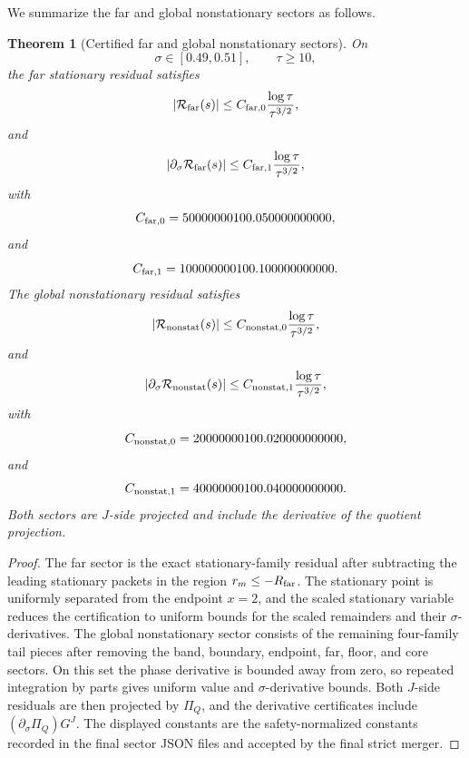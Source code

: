 \documentclass[11pt]{article}
\newtheorem{theorem}{Theorem}[section]
\newcommand{\s}{s}
\newcommand{\sig}{\sigma}
\newcommand{\tauh}{\tau}
\newcommand{\Rfar}{\mathcal R_{\rm far}}
\newcommand{\Rnonstat}{\mathcal R_{\rm nonstat}}
\newcommand{\PiQ}{\Pi_Q}
\begin{document}
We summarize the far and global nonstationary sectors as follows.

\begin{theorem}[Certified far and global nonstationary sectors]
On
\[
        \sig\in[0.49,0.51],
        \qquad
        \tauh\ge10,
\]
the far stationary residual satisfies
\[
        |\Rfar(\s)|
        \le
        C_{{\rm far},0}
        \frac{\log\tauh}{\tauh^{3/2}},
\]
and
\[
        |\partial_\sig\Rfar(\s)|
        \le
        C_{{\rm far},1}
        \frac{\log\tauh}{\tauh^{3/2}},
\]
with
\[
        C_{{\rm far},0}
        =
        50000000100.050000000000,
\]
and
\[
        C_{{\rm far},1}
        =
        100000000100.100000000000.
\]
The global nonstationary residual satisfies
\[
        |\Rnonstat(\s)|
        \le
        C_{{\rm nonstat},0}
        \frac{\log\tauh}{\tauh^{3/2}},
\]
and
\[
        |\partial_\sig\Rnonstat(\s)|
        \le
        C_{{\rm nonstat},1}
        \frac{\log\tauh}{\tauh^{3/2}},
\]
with
\[
        C_{{\rm nonstat},0}
        =
        20000000100.020000000000,
\]
and
\[
        C_{{\rm nonstat},1}
        =
        40000000100.040000000000.
\]
Both sectors are \(J\)-side projected and include the derivative of the
quotient projection.
\end{theorem}

\begin{proof}
The far sector is the exact stationary-family residual after subtracting the
leading stationary packets in the region \(r_m\le -R_{\rm far}\).  The
stationary point is uniformly separated from the endpoint \(x=2\), and the
scaled stationary variable reduces the certification to uniform bounds for the
scaled remainders and their \(\sig\)-derivatives.  The global nonstationary
sector consists of the remaining four-family tail pieces after removing the
band, boundary, endpoint, far, floor, and core sectors.  On this set the phase
derivative is bounded away from zero, so repeated integration by parts gives
uniform value and \(\sig\)-derivative bounds.  Both \(J\)-side residuals are
then projected by \(\PiQ\), and the derivative certificates include
\((\partial_\sig\PiQ)G^{J}\).  The displayed constants are the
safety-normalized constants recorded in the final sector JSON files and
accepted by the final strict merger.
\end{proof}


\end{document}
